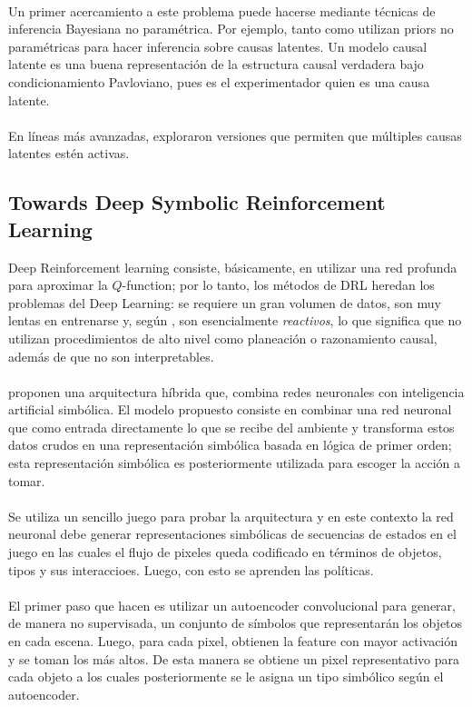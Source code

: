 \documentclass[11pt]{article}
\theoremstyle{plain}
\begin{document}
\\
Un primer acercamiento a este problema puede hacerse mediante técnicas de inferencia Bayesiana no paramétrica. Por ejemplo, tanto \cite{gershman2010learning} como \cite{gershman2012exploring} utilizan priors no paramétricas para hacer inferencia sobre causas latentes. Un modelo causal latente es una buena representación de la estructura causal verdadera bajo condicionamiento Pavloviano, pues es el experimentador quien es una causa latente.\\
\\
En líneas más avanzadas, \cite{courville2006bayesian} exploraron versiones que permiten que múltiples causas latentes estén activas.
\subsection{Towards Deep Symbolic Reinforcement Learning}
Deep Reinforcement learning consiste, básicamente, en utilizar una red profunda para aproximar la $Q$-function; por lo tanto, los métodos de DRL heredan los problemas del Deep Learning: se requiere un gran volumen de datos, son muy lentas en entrenarse y, según \cite{garnelo2016towards}, son esencialmente \textit{reactivos}, lo que significa que no utilizan procedimientos de alto nivel como planeación o razonamiento causal, además de que no son interpretables.\\
\\
\cite{garnelo2016towards} proponen una arquitectura híbrida que, combina redes neuronales con inteligencia artificial simbólica. El modelo propuesto consiste en combinar una red neuronal que como entrada directamente lo que se recibe del ambiente y transforma estos datos crudos en una representación simbólica basada en lógica de primer orden; esta representación simbólica es posteriormente utilizada para escoger la acción a tomar.\\
\\
Se utiliza un sencillo juego para probar la arquitectura y en este contexto la red neuronal debe generar representaciones simbólicas de secuencias de estados en el juego en las cuales el flujo de pixeles queda codificado en términos de objetos, tipos y sus interaccioes. Luego, con esto se aprenden las políticas.\\
\\
El primer paso que hacen es utilizar un autoencoder convolucional para generar, de manera no supervisada, un conjunto de símbolos que representarán los objetos en cada escena. Luego, para cada pixel, obtienen la feature con mayor activación y se toman los más altos. De esta manera se obtiene un pixel representativo para cada objeto a los cuales posteriormente se le asigna un tipo simbólico según el autoencoder.\\
\end{document}
